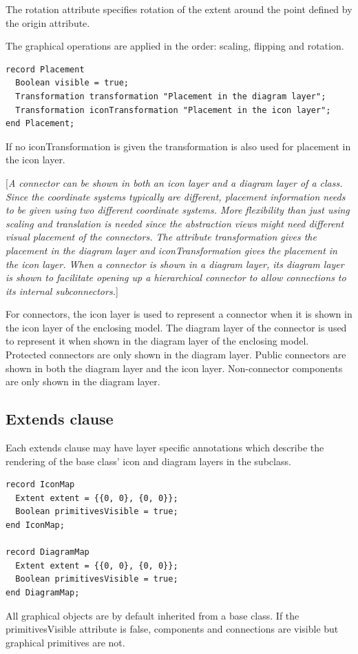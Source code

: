 \documentclass[10pt,a4paper]{report}
\def\doublelabel#1{\label{#1}\hypertarget{#1}{}}
\begin{document}
The rotation attribute specifies rotation of the extent around the point
defined by the origin attribute.

The graphical operations are applied in the order: scaling, flipping and
rotation.

\begin{lstlisting}[language=modelica]
record Placement
  Boolean visible = true;
  Transformation transformation "Placement in the diagram layer";
  Transformation iconTransformation "Placement in the icon layer";
end Placement;
\end{lstlisting}
If no iconTransformation is given the transformation is also used for
placement in the icon layer.

{[}\emph{A connector can be shown in both an icon layer and a diagram
layer of a class. Since the coordinate systems typically are different,
placement information needs to be given using two different coordinate
systems. More flexibility than just using scaling and translation is
needed since the abstraction views might need different visual placement
of the connectors. The attribute transformation gives the placement in
the diagram layer and iconTransformation gives the placement in the icon
layer. When a connector is shown in a diagram layer, its diagram layer
is shown to facilitate opening up a hierarchical connector to allow
connections to its internal subconnectors.}{]}

For connectors, the icon layer is used to represent a connector when it
is shown in the icon layer of the enclosing model. The diagram layer of
the connector is used to represent it when shown in the diagram layer of
the enclosing model. Protected connectors are only shown in the diagram
layer. Public connectors are shown in both the diagram layer and the
icon layer. Non-connector components are only shown in the diagram
layer.

\subsection{Extends clause}\doublelabel{extends-clause}

Each extends clause may have layer specific annotations which describe
the rendering of the base class' icon and diagram layers in the
subclass.

\begin{lstlisting}[language=modelica]
record IconMap
  Extent extent = {{0, 0}, {0, 0}};
  Boolean primitivesVisible = true;
end IconMap;

record DiagramMap
  Extent extent = {{0, 0}, {0, 0}};
  Boolean primitivesVisible = true;
end DiagramMap;
\end{lstlisting}
All graphical objects are by default inherited from a base class. If the
primitivesVisible attribute is false, components and connections are
visible but graphical primitives are not.
\end{document}
